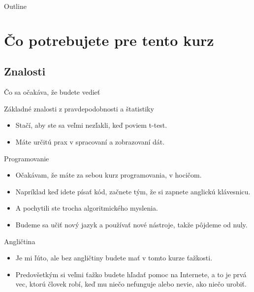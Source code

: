 \begin{frame}{Outline}
\tableofcontents
\end{frame}

\section{Čo potrebujete pre tento kurz}

\subsection{Znalosti}
\begin{frame}{Čo sa očakáva, že budete vedieť}
	\begin{block}{Základné znalosti z pravdepodobnosti a štatistiky}
		\begin{itemize}
			\item Stačí, aby ste sa veľmi nezľakli, keď poviem t-test.
			\item Máte určitú prax v spracovaní a zobrazovaní dát.
		\end{itemize}
	\end{block}
	\begin{block}{Programovanie}
		\begin{itemize}
			\item Očakávam, že máte za sebou kurz programovania, v hocičom.
			\item Napríklad keď idete písať kód, začnete tým, že si zapnete anglickú klávesnicu.
			\item A pochytili ste trocha algoritmického myslenia. 
			\item Budeme sa učiť nový jazyk a používať nové nástroje, takže pôjdeme od nuly.
		\end{itemize}
	\end{block}
	\begin{block}{Angličtina}
		\begin{itemize}
			\item Je mi ľúto, ale bez angličtiny budete mať v tomto kurze ťažkosti.
			\item Predovšetkým si veľmi ťažko budete hľadať pomoc na Internete, a to je prvá vec, ktorú človek robí, keď mu niečo nefunguje alebo nevie, ako niečo urobiť. 
		\end{itemize}
	\end{block}
\end{frame}


